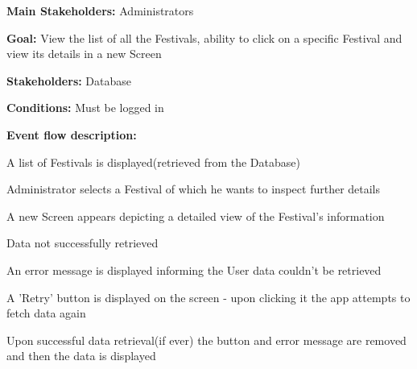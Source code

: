 				\noindent {}
				\begin{packed_item}
					\item \textbf{Main Stakeholders:} Administrators
					\item \textbf{Goal:} View the list of all the Festivals, ability to click on a specific Festival and view its details in a new Screen
					\item \textbf{Stakeholders:} Database
					\item \textbf{Conditions:} Must be logged in
					\item \textbf{Event flow description: }
					\begin{packed_enum}
						\item A list of Festivals is displayed(retrieved from the Database)
						\item Administrator selects a Festival of which he wants to inspect further details
						\item A new Screen appears depicting a detailed view of the Festival's information
					\end{packed_enum}
				
					\begin{packed_item}
						\item[1.a] Data not successfully retrieved
						\item[] \begin{packed_enum}
							\item An error message is displayed informing the User data couldn't be retrieved
							\item A 'Retry' button is displayed on the screen - upon clicking it the app attempts to fetch data again
							\item Upon successful data retrieval(if ever) the button and error message are removed and then the data is displayed
						\end{packed_enum}
					\end{packed_item}
					
				\end{packed_item}
					
